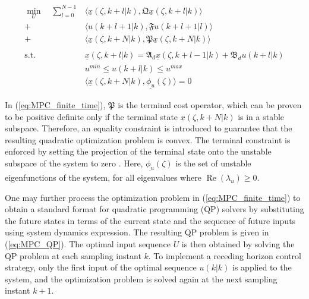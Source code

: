 \begin{equation} \label{eq:MPC_finite_time}
    \begin{aligned}
        \min_{U} \quad \sum_{l=0}^{N-1} &\langle \underline{x}(\zeta, k+l | k), \mathfrak{Q} \underline{x}(\zeta, k+l | k) \rangle \\
        + &\langle u(k+l+1 | k), \mathfrak{F} u(k+l+1|l) \rangle \\
        + &\langle \underline{x}(\zeta, k+N | k), \mathfrak{P} \underline{x}(\zeta, k+N | k) \rangle \\
        \, \\
        \text{s.t.} \quad &\underline{x}(\zeta, k+l | k) = \mathfrak{A}_d \underline{x}(\zeta, k+l-1 | k) + \mathfrak{B}_d u(k+l | k) \\
        &u^{min} \leq u(k+l | k) \leq u^{max} \\
        & \langle \underline{x}(\zeta, k+N | k), \underline{\phi_u}(\zeta) \rangle = 0
    \end{aligned}
\end{equation}

In (\ref{eq:MPC_finite_time}), $\mathfrak{P}$ is the terminal cost operator, which can be proven to be positive definite only if the terminal state $\underline{x}(\zeta, k+N | k)$ is in a stable subspace. Therefore, an equality constraint is introduced to guarantee that the resulting quadratic optimization problem is convex. The terminal constraint is enforced by setting the projection of the terminal state onto the unstable subspace of the system to zero \cite{xu2017linear, khatibi2021model}. Here, $\underline{\phi_u}(\zeta)$ is the set of unstable eigenfunctions of the system, for all eigenvalues where $\operatorname{Re}(\lambda_u) \geq 0$.

One may further process the optimization problem in (\ref{eq:MPC_finite_time}) to obtain a standard format for quadratic programming (QP) solvers by substituting the future states in terms of the current state and the sequence of future inputs using system dynamics expression. The resulting QP problem is given in (\ref{eq:MPC_QP}). The optimal input sequence $U$ is then obtained by solving the QP problem at each sampling instant $k$. To implement a receding horizon control strategy, only the first input of the optimal sequence $u(k|k)$ is applied to the system, and the optimization problem is solved again at the next sampling instant $k+1$.

